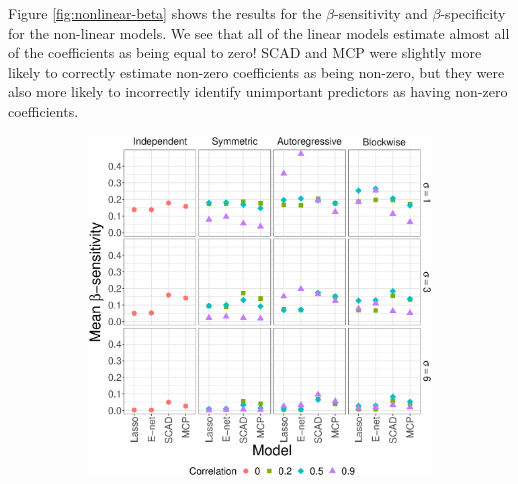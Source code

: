 \documentclass{article}
\begin{document}
	Figure \ref{fig:nonlinear-beta} shows the results for the $\beta$-sensitivity and $\beta$-specificity for the non-linear models. We see that all of the linear models estimate almost all of the coefficients as being equal to zero! SCAD and MCP were slightly more likely to correctly estimate non-zero coefficients as being non-zero, but they were also more likely to incorrectly identify unimportant predictors as having non-zero coefficients.
	\begin{figure}[!htb]
		\centering
		\begin{subfigure}[b]{0.47\textwidth}
			\includegraphics[width=\textwidth]{images/facet/publication_facet_sensitivity_nonlinear_50_2000.eps}
			\label{fig:nonlinear-sensitivity}
		\end{subfigure}
		\hspace{6pt}
		\begin{subfigure}[b]{0.47\textwidth}

\end{subfigure}
\end{figure}
\end{document}
